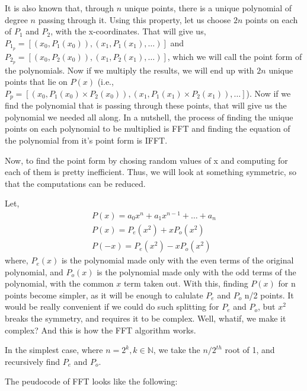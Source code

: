 It is also known that, through $n$ unique points, there is a unique polynomial of degree $n$ passing through it. Using this property, let us choose $2n$ points on each of $P_1$ and $P_2$, with the x-coordinates. That will give us, $P_{1_p} = [(x_0, P_1(x_0)), (x_1, P_1(x_1), \dots)]$ and $P_{2_p} = [(x_0, P_2(x_0)), (x_1, P_2(x_1), \dots)]$, which we will call the point form of the polynomials. Now if we multiply the results, we will end up with $2n$ unique points that lie on $P(x)$ (i.e., $P_p = [(x_0, P_1(x_0)\times P_2(x_0)), (x_1, P_1(x_1)\times P_2(x_1)), \dots]$). Now if we find the polynomial that is passing through these points, that will give us the polynomial we needed all along.
In a nutshell, the process of finding the unique points on each polynomial to be multiplied is FFT and finding the equation of the polynomial from it's point form is IFFT.

Now, to find the point form by chosing random values of x and computing for each of them is pretty inefficient. Thus, we will look at something symmetric, so that the computations can be reduced.

Let,
\begin{align*}
    P(x) = a_0x^n + a_1x^{n-1} + \dots + a_n\\
    P(x) = P_e(x^2) + xP_o(x^2)\\
    P(-x) = P_e(x^2) -xP_o(x^2)
\end{align*}
where, $P_e(x)$ is the polynomial made only with the even terms of the original polynomial, and $P_o(x)$ is the polynomial made only with the odd terms of the polynomial, with the common $x$ term taken out.
With this, finding $P(x)$ for n points become simpler, as it will be enough to calulate $P_e$ and $P_o$ n/2 points. It would be really convenient if we could do such splitting for $P_e$ and $P_o$, but $x^2$ breaks the symmetry, and requires it to be complex. Well, whatif, we make it complex? And this is how the FFT algorithm works.

In the simplest case, where $n=2^k,k\in \mathbb{N}$, we take the $n/2^{th}$ root of 1, and recursively find $P_e$ and $P_o$.

The peudocode of FFT looks like the following:

